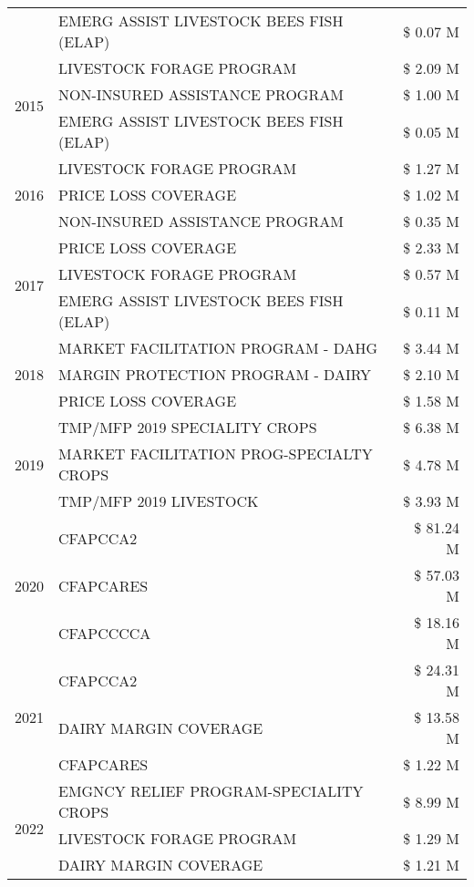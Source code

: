 \begin{tabular}{llr}
 & EMERG ASSIST LIVESTOCK BEES FISH (ELAP) & \$ 0.07 M \\
\cline{1-3}
\multirow[t]{3}{*}{2015} & LIVESTOCK FORAGE PROGRAM & \$ 2.09 M \\
 & NON-INSURED ASSISTANCE PROGRAM & \$ 1.00 M \\
 & EMERG ASSIST LIVESTOCK BEES FISH (ELAP) & \$ 0.05 M \\
\cline{1-3}
\multirow[t]{3}{*}{2016} & LIVESTOCK FORAGE PROGRAM & \$ 1.27 M \\
 & PRICE LOSS COVERAGE & \$ 1.02 M \\
 & NON-INSURED ASSISTANCE PROGRAM & \$ 0.35 M \\
\cline{1-3}
\multirow[t]{3}{*}{2017} & PRICE LOSS COVERAGE & \$ 2.33 M \\
 & LIVESTOCK FORAGE PROGRAM & \$ 0.57 M \\
 & EMERG ASSIST LIVESTOCK BEES FISH (ELAP) & \$ 0.11 M \\
\cline{1-3}
\multirow[t]{3}{*}{2018} & MARKET FACILITATION PROGRAM - DAHG & \$ 3.44 M \\
 & MARGIN PROTECTION PROGRAM - DAIRY & \$ 2.10 M \\
 & PRICE LOSS COVERAGE & \$ 1.58 M \\
\cline{1-3}
\multirow[t]{3}{*}{2019} & TMP/MFP 2019 SPECIALITY CROPS & \$ 6.38 M \\
 & MARKET FACILITATION PROG-SPECIALTY CROPS & \$ 4.78 M \\
 & TMP/MFP 2019 LIVESTOCK & \$ 3.93 M \\
\cline{1-3}
\multirow[t]{3}{*}{2020} & CFAPCCA2 & \$ 81.24 M \\
 & CFAPCARES & \$ 57.03 M \\
 & CFAPCCCCA & \$ 18.16 M \\
\cline{1-3}
\multirow[t]{3}{*}{2021} & CFAPCCA2 & \$ 24.31 M \\
 & DAIRY MARGIN COVERAGE & \$ 13.58 M \\
 & CFAPCARES & \$ 1.22 M \\
\cline{1-3}
\multirow[t]{3}{*}{2022} & EMGNCY RELIEF PROGRAM-SPECIALITY CROPS & \$ 8.99 M \\
 & LIVESTOCK FORAGE PROGRAM & \$ 1.29 M \\
 & DAIRY MARGIN COVERAGE & \$ 1.21 M \\
\cline{1-3}
\bottomrule
\end{tabular}
